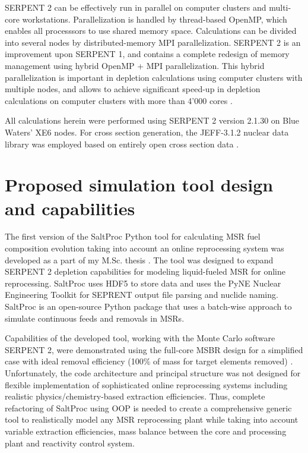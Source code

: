 SERPENT 2 can be effectively run in parallel on computer clusters and multi-core workstations. Parallelization is handled by thread-based OpenMP, which enables all processsors to use shared memory space. Calculations can be divided into several nodes by distributed-memory \gls{MPI} parallelization. SERPENT 2  is an improvement upon SERPENT 1, and contains a complete redesign of memory management using hybrid OpenMP \cite{dagum_openmp_1998} + \gls{MPI} parallelization.  This hybrid parallelization is important in depletion calculations using computer clusters with multiple nodes, and allows to achieve significant speed-up in depletion calculations on computer clusters with more than 4'000 cores \cite{leppanen_serpent_2015}. 

All calculations herein were performed using SERPENT 2 version 2.1.30 on Blue Waters’ XE6 nodes. For cross section generation, the JEFF-3.1.2 nuclear data library was employed based on entirely open cross section data 
\cite{oecd/nea_data_bank_jeff-3.1.2_2014}. 

\section{Proposed simulation tool design and capabilities} \label{sec:tool_design}
The first version of the SaltProc Python tool for calculating \gls{MSR} fuel 
composition evolution taking into account an online reprocessing system 
was developed as a part of my M.Sc. thesis \cite{rykhlevskii_advanced_2018,
rykhlevskii_arfc/saltproc_2018}. The tool was designed to 
expand SERPENT 2 depletion capabilities for modeling liquid-fueled \gls{MSR} 
for online reprocessing. SaltProc uses HDF5 
\cite{the_hdf_group_hierarchical_1997} to store 
data and uses the PyNE Nuclear Engineering Toolkit \cite{scopatz_pyne_2012}
for SEPRENT output file parsing and nuclide naming. SaltProc is an 
open-source Python package that uses a batch-wise approach to simulate 
continuous feeds and removals in \glspl{MSR}. 

Capabilities of the developed tool, working with the Monte Carlo software 
SERPENT 2, were demonstrated using the full-core MSBR design for a 
simplified case with ideal removal efficiency (100\% of mass for target 
elements removed) \cite{rykhlevskii_modeling_2019}. Unfortunately, 
the code architecture and principal structure was not designed for 
flexible implementation of sophisticated online reprocessing systems 
including realistic physics/chemistry-based extraction efficiencies. 
Thus, complete refactoring of SaltProc using \gls{OOP} is needed to 
create a comprehensive generic tool to realistically model any \gls{MSR} 
reprocessing plant while taking into account variable extraction 
efficiencies, mass balance between the core and processing plant and 
reactivity control system.

